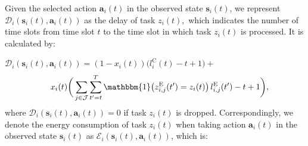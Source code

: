 \documentclass[10pt, journal,letterpaper]{IEEEtran}
\begin{document}
	
 Given the selected action $\boldsymbol{a}_i(t)$ in the observed state $\boldsymbol{s}_i(t)$, we represent $\mathcal{D}_i(\boldsymbol{s}_i(t), \boldsymbol{a}_i(t))$ as the delay of task $z_i(t),$ which indicates the number of time slots from time slot $t$ to the time slot in which task $z_i(t)$ is processed. It is calculated by: \vspace{2mm}

$\mathcal{D}_i(\boldsymbol{s}_i(t),\boldsymbol{a}_i(t)) = (1-x_i(t))\Big(l_i^{\text{C}}(t) - t + 1\Big)  + $
\begin{alignat}{1}
	\hspace{0.4cm} x_i(t) \bigg(  \sum\limits_{j \in \mathcal{J}} \sum\limits_{t'=t}^{T} \mathbbm{1}\big(z_{i,j}^{\text{E}}(t') = z_i(t)\big)\, l_{i,j}^{\text{E}}(t') - t +1\bigg),
	\label{21}  
\end{alignat} 
where $\mathcal{D}_i(\boldsymbol{s}_i(t),\boldsymbol{a}_i(t))= 0$ if task $z_i(t)$ is dropped. Correspondingly, we denote the energy consumption of task $z_i(t)$ when taking action $\boldsymbol{a}_i(t)$ in the observed state $\boldsymbol{s}_i(t)$ as $\mathcal{E}_i(\boldsymbol{s}_i(t),\boldsymbol{a}_i(t))$, which is: \vspace{1.7mm}
\end{document}

